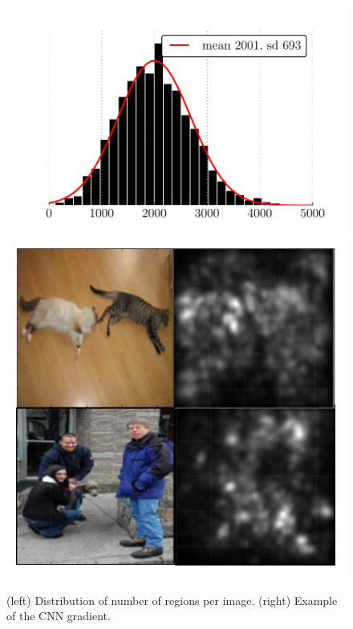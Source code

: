 \begin{figure}
\centering
\includegraphics[width=0.52\linewidth]{../ccnn/figures/roi_hist.pdf}
\hfill
\includegraphics[width=0.4\linewidth]{../ccnn/figures/gradient.pdf}
\caption{
(left) Distribution of number of regions per image.
(right) Example of the CNN gradient.
}\label{fig:roi_hist_and_gradient}
\end{figure}
